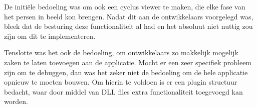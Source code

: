 De initi\"ele bedoeling was om ook een cyclus viewer te maken, die elke fase van het persen in beeld kon brengen. Nadat dit aan de ontwikkelaars voorgelegd was, bleek dat de besturing deze functionaliteit al had en het absoluut niet nuttig zou zijn om dit te implementeren.

Tenslotte was het ook de bedoeling, om ontwikkelaars zo makkelijk mogelijk zaken te laten toevoegen aan de applicatie. Mocht er een zeer specifiek probleem zijn om te debuggen, dan was het zeker niet de bedoeling om de hele applicatie opnieuw te moeten bouwen. Om hierin te voldoen is er een plugin structuur bedacht, waar door middel van DLL files extra functionaliteit toegevoegd kan worden.
